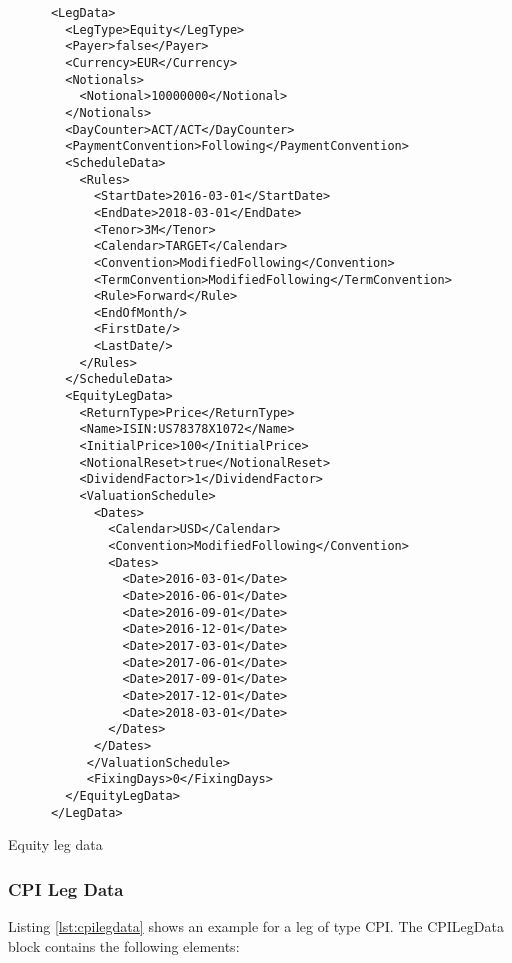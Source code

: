 \begin{listing}[H]
\begin{verbatim}
      <LegData>
        <LegType>Equity</LegType>
        <Payer>false</Payer>
        <Currency>EUR</Currency>
        <Notionals>
          <Notional>10000000</Notional>
        </Notionals>
        <DayCounter>ACT/ACT</DayCounter>
        <PaymentConvention>Following</PaymentConvention>
        <ScheduleData>
          <Rules>
            <StartDate>2016-03-01</StartDate>
            <EndDate>2018-03-01</EndDate>
            <Tenor>3M</Tenor>
            <Calendar>TARGET</Calendar>
            <Convention>ModifiedFollowing</Convention>
            <TermConvention>ModifiedFollowing</TermConvention>
            <Rule>Forward</Rule>
            <EndOfMonth/>
            <FirstDate/>
            <LastDate/>
          </Rules>
        </ScheduleData>
        <EquityLegData>
          <ReturnType>Price</ReturnType>
          <Name>ISIN:US78378X1072</Name>
          <InitialPrice>100</InitialPrice>
          <NotionalReset>true</NotionalReset>
          <DividendFactor>1</DividendFactor>
          <ValuationSchedule>
            <Dates>
              <Calendar>USD</Calendar>
              <Convention>ModifiedFollowing</Convention>
              <Dates>
                <Date>2016-03-01</Date>
                <Date>2016-06-01</Date>
                <Date>2016-09-01</Date>
                <Date>2016-12-01</Date>
                <Date>2017-03-01</Date>
                <Date>2017-06-01</Date>
                <Date>2017-09-01</Date>
                <Date>2017-12-01</Date>
                <Date>2018-03-01</Date>
              </Dates>
            </Dates>
           </ValuationSchedule>
           <FixingDays>0</FixingDays>
        </EquityLegData>
      </LegData>
\end{verbatim}
\caption{Equity leg data}
\label{lst:equitylegdata}
\end{listing}





\subsubsection{CPI Leg Data}
\label{ss:cpilegdata}

Listing \ref{lst:cpilegdata} shows an example for a leg of type CPI. The CPILegData block contains the following
elements:

